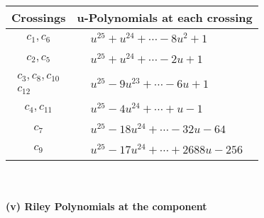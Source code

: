 \documentclass[1p]{elsarticle_modified}
\theoremstyle{definition}
\begin{document}
\begin{tabular}{m{50pt}|m{274pt}}
Crossings & \hspace{64pt}u-Polynomials at each crossing \\
\hline $$\begin{aligned}c_{1},c_{6}\end{aligned}$$&$\begin{aligned}
&u^{25}+u^{24}+\cdots-8 u^2+1
\end{aligned}$\\
\hline $$\begin{aligned}c_{2},c_{5}\end{aligned}$$&$\begin{aligned}
&u^{25}+u^{24}+\cdots-2 u+1
\end{aligned}$\\
\hline $$\begin{aligned}c_{3},c_{8},c_{10}\\c_{12}\end{aligned}$$&$\begin{aligned}
&u^{25}-9 u^{23}+\cdots-6 u+1
\end{aligned}$\\
\hline $$\begin{aligned}c_{4},c_{11}\end{aligned}$$&$\begin{aligned}
&u^{25}-4 u^{24}+\cdots+u-1
\end{aligned}$\\
\hline $$\begin{aligned}c_{7}\end{aligned}$$&$\begin{aligned}
&u^{25}-18 u^{24}+\cdots-32 u-64
\end{aligned}$\\
\hline $$\begin{aligned}c_{9}\end{aligned}$$&$\begin{aligned}
&u^{25}-17 u^{24}+\cdots+2688 u-256
\end{aligned}$\\
\hline
\end{tabular}\\~\\
\newpage\renewcommand{\arraystretch}{1}
\flushleft \textbf{(v) Riley Polynomials at the component}\newline \\
\end{document}
